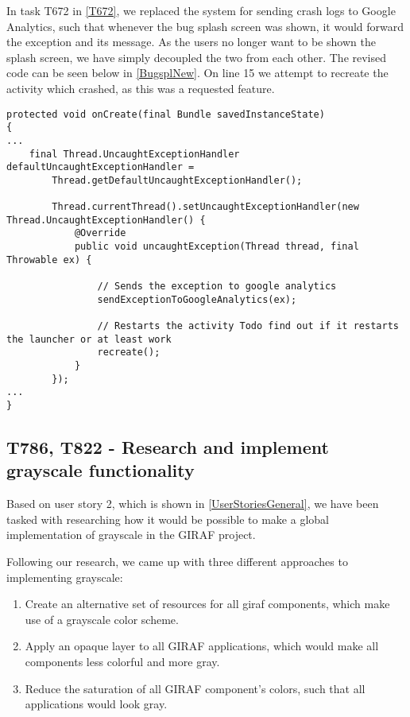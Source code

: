 In task T672 in \autoref{T672}, we replaced the system for sending crash logs to
Google Analytics, such that whenever the bug splash screen was shown, it would
forward the exception and its message. As the users no longer want to be shown
the splash screen, we have simply decoupled the two from each other. The revised
code can be seen below in \autoref{BugsplNew}. On line 15 we attempt to recreate
the activity which crashed, as this was a requested feature.\nl

\begin{minipage}[H]{\linewidth}
\begin{lstlisting}[caption = We use Google Analytics and try to recreate the activity, label = BugsplNew] 
protected void onCreate(final Bundle savedInstanceState) 
{ 
...
	final Thread.UncaughtExceptionHandler defaultUncaughtExceptionHandler =
    	Thread.getDefaultUncaughtExceptionHandler();

        Thread.currentThread().setUncaughtExceptionHandler(new Thread.UncaughtExceptionHandler() {
            @Override
            public void uncaughtException(Thread thread, final Throwable ex) {

                // Sends the exception to google analytics
                sendExceptionToGoogleAnalytics(ex);

                // Restarts the activity Todo find out if it restarts the launcher or at least work
                recreate();
            }
        });
...
}
\end{lstlisting}
\end{minipage}

\subsection{T786, T822 - Research and implement grayscale functionality}
Based on user story 2, which is shown in \autoref{UserStoriesGeneral}, we have
been tasked with researching how it would be possible to make a global
implementation of grayscale in the GIRAF project.\nl

Following our research, we came up with three different approaches to
implementing grayscale:

\begin{enumerate}
  \item Create an alternative set of resources for all giraf components, which
  make use of a grayscale color scheme.
  \item Apply an opaque layer to all GIRAF applications, which would make all
  components less colorful and more gray.
  \item Reduce the saturation of all GIRAF component's colors, such that all
  applications would look gray.
\end{enumerate}

